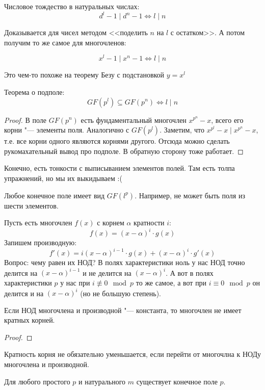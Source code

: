 \begin{lemma}
	Числовое тождество в натуральных числах:
	\[
	d^l - 1 \mid d^n - 1 \iff l \mid n
	\]
\end{lemma}
Доказывается для чисел методом <<поделить $n$ на $l$ с остатком>>.
А потом получим то же самое для многочленов:
\begin{lemma}
	\[
	x^l - 1 \mid x^n - 1 \iff l \mid n
	\]
\end{lemma}
\begin{Rem}
	Это чем-то похоже на теорему Безу с подстановкой $y=x^l$
\end{Rem}

\begin{theorem}
	Теорема о подполе:
	\[
	GF(p^l) \subseteq GF(p^n) \iff l \mid n
	\]
\end{theorem}
\begin{proof}
В поле $GF(p^n)$ есть фундаментальный многочлен $x^{p^n}-x$,
всего его корни "--- элементы поля.
Аналогично с $GF(p^l)$.
Заметим, что $x^{p^l}-x \mid x^{p^n}-x$, т.е. все корни
одного являются корнями другого.
Отсюда можно сделать рукомахательный вывод про подполе.
В обратную сторону тоже работает.
\end{proof}
\begin{Rem}
Конечно, есть тонкости с выписыванием элементов полей.
Там есть толпа упражнений, но мы их выкидываем :(
\end{Rem}

\begin{lemma}
	Любое конечное поле имеет вид $GF(l^p)$.
	Например, не может быть поля из шести элементов.
\end{lemma}

Пусть есть многочлен $f(x)$ с корнем $\alpha$ кратности $i$:
\[
	f(x) = (x - \alpha)^i \cdot g(x)
\]
Запишем производную:
\[
	f'(x) = i(x - \alpha)^{i-1} \cdot g(x) + (x - \alpha)^i \cdot g'(x)
\]
Вопрос: чему равен их НОД?
В полях характеристики ноль у нас НОД точно делится на $(x-\alpha)^{i-1}$ и не делится на $(x-\alpha)^i$.
А вот в полях характеристики $p$ у нас при $i \nequiv 0 \mod p$
то же самое, а вот при $i \equiv 0 \mod p$ он делится и на $(x-\alpha)^i$
(но не большую степень).
\begin{conseq}
	Если НОД многочлена и производной "--- константа, то многочлен не имеет кратных корней.
\end{conseq}
\begin{proof}
	\TODO
\end{proof}
\begin{Rem}
	Кратность корня не обязательно уменьшается, если перейти от многочлна к НОДу многочлена и производной.
\end{Rem}
\begin{theorem}
	Для любого простого $p$ и натурального $m$
	существует конечное поле $p$.
\end{theorem}

